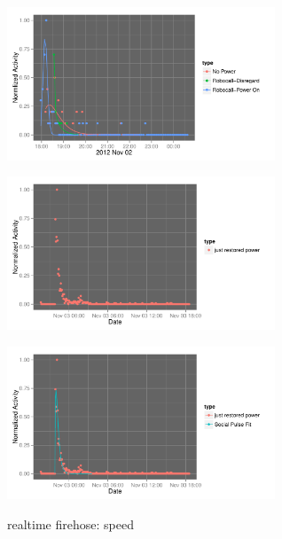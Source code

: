 \documentclass{beamer}
\begin{document}
\begin{frame}
  \begin{center}
    \includegraphics[width=8cm]{./imgs/fake_fit2.pdf}
  \end{center}
\end{frame}

\begin{frame}
  \begin{center}
    \includegraphics[width=8cm]{./imgs/real.pdf}
  \end{center}
\end{frame}

\begin{frame}
  \begin{center}
    \includegraphics[width=8cm]{./imgs/real_fit.pdf}
  \end{center}
\end{frame}


\begin{frame}
\begin{center}
{\Huge realtime firehose: speed}
\end{center}
\end{frame}
\end{document}
